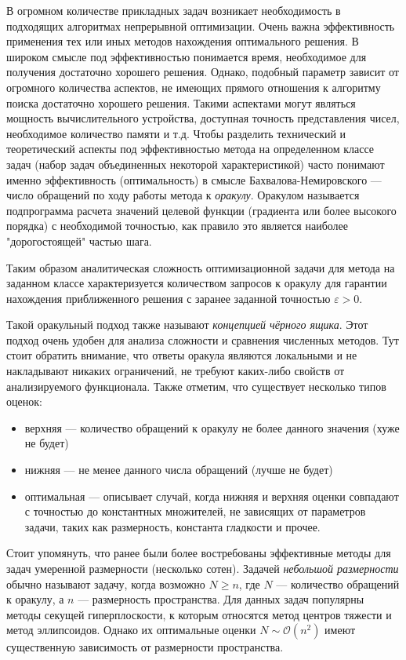 
{\actuality} 
В огромном количестве прикладных задач возникает необходимость в подходящих алгоритмах непрерывной оптимизации. Очень важна эффективность применения тех или иных методов нахождения оптимального решения. В широком смысле под эффективностью понимается время, необходимое для получения достаточно хорошего решения. Однако, подобный параметр зависит от огромного количества аспектов, не имеющих прямого отношения к алгоритму поиска достаточно хорошего решения. Такими аспектами могут являться мощность вычислительного устройства, доступная точность представления чисел, необходимое количество памяти и т.д. Чтобы разделить технический и теоретический аспекты под эффективностью метода на определенном классе задач (набор задач объединенных некоторой характеристикой) часто понимают именно эффективность (оптимальность) в смысле Бахвалова-Немировского \cite{Nemirovski1979} --- число обращений по ходу работы метода к \textit{оракулу}. Оракулом называется подпрограмма расчета значений целевой функции (градиента или  более высокого порядка) с необходимой точностью, как правило это является наиболее "дорогостоящей" частью шага.

Таким образом аналитическая сложность оптимизационной задачи для метода на заданном классе характеризуется количеством запросов к оракулу для гарантии нахождения приближенного решения с заранее заданной точностью $\varepsilon > 0$.

Такой оракульный подход также называют \textit{концепцией чёрного ящика}. Этот подход очень удобен для анализа сложности и сравнения численных методов. Тут стоит обратить внимание, что ответы оракула являются локальными и не накладывают никаких ограничений, не требуют каких-либо свойств от анализируемого функционала. Также отметим, что существует несколько типов оценок:
\begin{itemize}
    \item верхняя --- количество обращений к оракулу не более данного значения (хуже не будет)
    \item нижняя --- не менее данного числа обращений (лучше не будет)
    \item оптимальная --- описывает случай, когда нижняя и верхняя оценки совпадают с точностью до константных множителей, не зависящих от параметров задачи, таких как размерность, константа гладкости и прочее.
\end{itemize}

Стоит упомянуть, что ранее были более востребованы эффективные методы для задач умеренной размерности (несколько сотен). Задачей \textit{небольшой размерности} обычно называют задачу, когда возможно $N \geq n$, где $N$ --- количество обращений к оракулу, а $n$ --- размерность пространства. Для данных задач популярны методы секущей гиперплоскости, к которым относятся метод центров тяжести и метод эллипсоидов. Однако их оптимальные оценки $N \sim \mathcal{O}\left(n^2\right)$ имеют существенную зависимость от размерности пространства. \cite{bubeck_2015}

